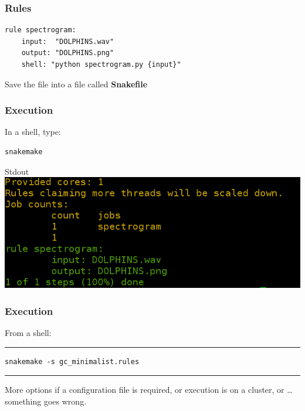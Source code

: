 \documentclass{beamer}
\begin{document}
\begin{frame}[fragile]
\frametitle{Rules}
\begin{center}

      \begin{minipage}{11cm}
        \begin{block}{}
            \begin{lstlisting}[basicstyle=\large]
rule spectrogram:
    input:  "DOLPHINS.wav"
    output: "DOLPHINS.png"
    shell: "python spectrogram.py {input}"
        \end{lstlisting}
         \end{block}        
          \end{minipage}
          \end{center}
\vspace{1cm}          
Save the file into a file called \textbf{Snakefile}          
 
\end{frame}


\begin{frame}[fragile]
\frametitle{Execution}

      \begin{block}{In a shell, type:}
	  \begin{lstlisting}[basicstyle=\large]
	  snakemake
	  \end{lstlisting}
      \end{block}
    \begin{block}{Stdout}
    \centering
    \includegraphics[scale=0.3]{images/screen1.png}
    \end{block}     
\end{frame}


\begin{frame}[fragile]
 \frametitle{Execution}
 
From a shell:
\rule{\textwidth}{1pt}
 
 
\begin{lstlisting}[basicstyle=\ttfamily\large]
snakemake -s gc_minimalist.rules
\end{lstlisting}
 
 \rule{\textwidth}{1pt}
 
More options if a configuration file is required, or execution is on a cluster, 
or \dots something goes wrong.
\end{frame}
\end{document}
